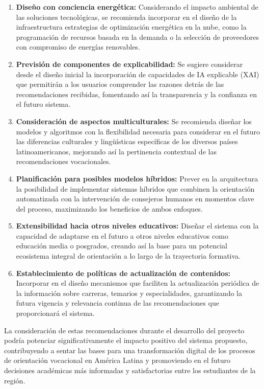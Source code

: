\begin{enumerate}
\item \textbf{Diseño con conciencia energética:} Considerando el impacto ambiental de las soluciones tecnológicas, se recomienda incorporar en el diseño de la infraestructura estrategias de optimización energética en la nube, como la programación de recursos basada en la demanda o la selección de proveedores con compromiso de energías renovables.
\item \textbf{Previsión de componentes de explicabilidad:} Se sugiere considerar desde el diseño inicial la incorporación de capacidades de IA explicable (XAI) que permitirán a los usuarios comprender las razones detrás de las recomendaciones recibidas, fomentando así la transparencia y la confianza en el futuro sistema.
\item \textbf{Consideración de aspectos multiculturales:} Se recomienda diseñar los modelos y algoritmos con la flexibilidad necesaria para considerar en el futuro las diferencias culturales y lingüísticas específicas de los diversos países latinoamericanos, mejorando así la pertinencia contextual de las recomendaciones vocacionales.
\item \textbf{Planificación para posibles modelos híbridos:} Prever en la arquitectura la posibilidad de implementar sistemas híbridos que combinen la orientación automatizada con la intervención de consejeros humanos en momentos clave del proceso, maximizando los beneficios de ambos enfoques.
\item \textbf{Extensibilidad hacia otros niveles educativos:} Diseñar el sistema con la capacidad de adaptarse en el futuro a otros niveles educativos como educación media o posgrados, creando así la base para un potencial ecosistema integral de orientación a lo largo de la trayectoria formativa.
\item \textbf{Establecimiento de políticas de actualización de contenidos:} Incorporar en el diseño mecanismos que faciliten la actualización periódica de la información sobre carreras, temarios y especialidades, garantizando la futura vigencia y relevancia continua de las recomendaciones que proporcionará el sistema.
\end{enumerate}
La consideración de estas recomendaciones durante el desarrollo del proyecto podría potenciar significativamente el impacto positivo del sistema propuesto, contribuyendo a sentar las bases para una transformación digital de los procesos de orientación vocacional en América Latina y promoviendo en el futuro decisiones académicas más informadas y satisfactorias entre los estudiantes de la región.